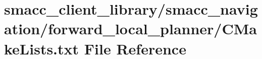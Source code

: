 \hypertarget{smacc__client__library_2smacc__navigation_2forward__local__planner_2CMakeLists_8txt}{}\section{smacc\+\_\+client\+\_\+library/smacc\+\_\+navigation/forward\+\_\+local\+\_\+planner/\+C\+Make\+Lists.txt File Reference}
\label{smacc__client__library_2smacc__navigation_2forward__local__planner_2CMakeLists_8txt}
